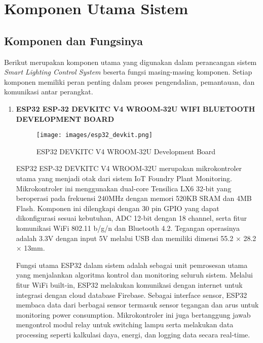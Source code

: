 \documentclass[12pt,a4paper]{article}
\begin{document}
\newpage

\section{Komponen Utama Sistem}

\subsection{Komponen dan Fungsinya}

Berikut merupakan komponen utama yang digunakan dalam perancangan sistem \textit{Smart Lighting Control System} beserta fungsi masing-masing komponen. Setiap komponen memiliki peran penting dalam proses pengendalian, pemantauan, dan komunikasi antar perangkat.

\begin{enumerate}[leftmargin=0pt,itemsep=1em]

\item \textbf{ESP32 ESP-32 DEVKITC V4 WROOM-32U WIFI BLUETOOTH DEVELOPMENT BOARD}

\begin{figure}[H]
\centering
\texttt{[image: images/esp32\_devkit.png]}
\caption{ESP32 DEVKITC V4 WROOM-32U Development Board}
\label{fig:esp32}
\end{figure}

ESP32 ESP-32 DEVKITC V4 WROOM-32U merupakan mikrokontroler utama yang menjadi otak dari sistem IoT Foundry Plant Monitoring. Mikrokontroler ini menggunakan dual-core Tensilica LX6 32-bit yang beroperasi pada frekuensi 240MHz dengan memori 520KB SRAM dan 4MB Flash. Komponen ini dilengkapi dengan 30 pin GPIO yang dapat dikonfigurasi sesuai kebutuhan, ADC 12-bit dengan 18 channel, serta fitur komunikasi WiFi 802.11 b/g/n dan Bluetooth 4.2. Tegangan operasinya adalah 3.3V dengan input 5V melalui USB dan memiliki dimensi 55.2 × 28.2 × 13mm.

Fungsi utama ESP32 dalam sistem adalah sebagai unit pemrosesan utama yang menjalankan algoritma kontrol dan monitoring seluruh sistem. Melalui fitur WiFi built-in, ESP32 melakukan komunikasi dengan internet untuk integrasi dengan cloud database Firebase. Sebagai interface sensor, ESP32 membaca data dari berbagai sensor termasuk sensor tegangan dan arus untuk monitoring power consumption. Mikrokontroler ini juga bertanggung jawab mengontrol modul relay untuk switching lampu serta melakukan data processing seperti kalkulasi daya, energi, dan logging data secara real-time.


\end{enumerate}
\end{document}
